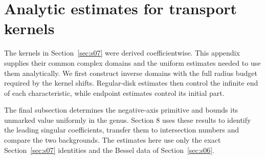 \section{Analytic estimates for transport kernels}
\label{sec:appendix-b}

The kernels in Section~\ref{sec:s07} were derived coefficientwise.
This appendix supplies their common complex domains and the uniform
estimates needed to use them analytically. We first construct inverse
domains with the full radius budget required by the kernel shifts.
Regular-disk estimates then control the infinite end of each
characteristic, while endpoint estimates control its initial part.

The final subsection determines the negative-axis primitive and bounds
its unmarked value uniformly in the genus. Section 8 uses these results
to identify the leading singular coefficients, transfer them to
intersection numbers and compare the two backgrounds. The estimates
here use only the exact Section~\ref{sec:s07} identities and the
Bessel data of Section~\ref{sec:s06}.






